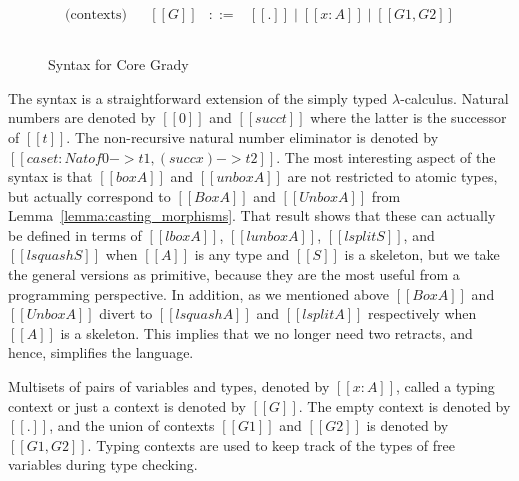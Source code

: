 \begin{figure}
\begin{mdframed}
\[\begin{array}{cl}
        \begin{array}{lll}
          \text{(contexts)}\\
        \end{array}  &
        \begin{array}{lcl}
          [[G]] & ::= & [[.]] \mid [[x : A]] \mid [[G1,G2]]\\
        \end{array}\\
      \end{array}
      \]    
  \end{mdframed}
  \caption{Syntax for Core Grady}
  \label{fig:syntax-core-grady}
\end{figure}
The syntax is a straightforward extension of the simply typed
$\lambda$-calculus.  Natural numbers are denoted by $[[0]]$ and
$[[succ t]]$ where the latter is the successor of $[[t]]$.  The
non-recursive natural number eliminator is denoted by $[[case t : Nat
    of 0 -> t1, (succ x) -> t2]]$.  The most interesting aspect of the
syntax is that $[[box A]]$ and $[[unbox A]]$ are not restricted to
atomic types, but actually correspond to $[[Box A]]$ and $[[Unbox A]]$
from Lemma~\ref{lemma:casting_morphisms}.  That result shows that
these can actually be defined in terms of $[[lbox A]]$, $[[lunbox A]]$,
$[[lsplit S]]$, and $[[lsquash S]]$ when $[[A]]$ is any type and $[[S]]$
is a skeleton, but we take the general versions as primitive, because
they are the most useful from a programming perspective.  In addition,
as we mentioned above $[[Box A]]$ and $[[Unbox A]]$ divert to
$[[lsquash A]]$ and $[[lsplit A]]$ respectively when $[[A]]$ is a
skeleton.  This implies that we no longer need two retracts, and
hence, simplifies the language.

Multisets of pairs of variables and types, denoted by $[[x : A]]$,
called a typing context or just a context is denoted by $[[G]]$.  The
empty context is denoted by $[[.]]$, and the union of contexts
$[[G1]]$ and $[[G2]]$ is denoted by $[[G1,G2]]$.  Typing contexts are
used to keep track of the types of free variables during type
checking.

